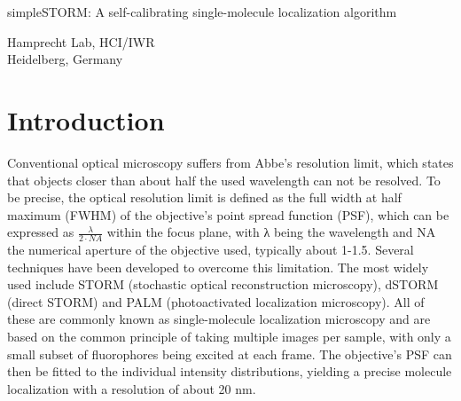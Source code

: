 \documentclass[a4paper,12pt,notitlepage]{report}
\newcommand{\myTitle}{{simpleSTORM: A self-calibrating single-molecule localization algorithm}}
\begin{document}

\begin{titlepage}
    \centering
    \vspace*{2cm}
    \Huge
    \myTitle

    \vspace{4cm}

    Hamprecht Lab, HCI/IWR\\
    Heidelberg, Germany

    \vspace{5cm}

    \the\year
    \thispagestyle{empty}
\end{titlepage}

\pagestyle{frontmatter}
\tableofcontents
\newpage

\parskip0.5cm
\parindent1cm
\titlespacing*{\section}{0cm}{0.75cm}{0cm}

\pagestyle{main}
\chapter{Introduction}
Conventional optical microscopy suffers from Abbe's resolution limit, which states that objects closer than about half the used wavelength can not be resolved. To be precise, the optical resolution limit is defined as the full width at half maximum (FWHM) of the objective's point spread function (PSF), which can be expressed as $\frac{\lambda}{2 \cdot \mathit{NA}}$ within the focus plane, with λ being the wavelength and NA the numerical aperture of the objective used, typically about 1-1.5. Several techniques have been developed to overcome this limitation. The most widely used include STORM\citep{pmid16896339} (stochastic optical reconstruction microscopy), dSTORM\citep{pmid18646237} (direct STORM) and PALM\citep{pmid16902090} (photoactivated localization microscopy). All of these are commonly known as single-molecule localization microscopy and are based on the common principle of taking multiple images per sample, with only a small subset of fluorophores being excited at each frame. The objective's PSF can then be fitted to the individual intensity distributions, yielding a precise molecule localization with a resolution of about 20 nm\citep{pmid18646237}.
\end{document}
